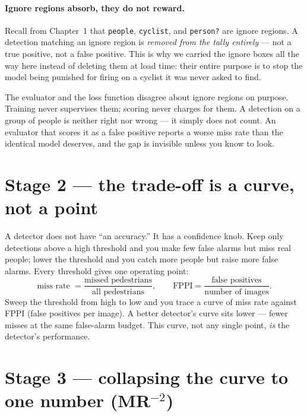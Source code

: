 \documentclass[../main.tex]{subfiles}
\begin{document}
\paragraph{Ignore regions absorb, they do not reward.} Recall from Chapter~1 that
\texttt{people}, \texttt{cyclist}, and \texttt{person?} are ignore regions. A detection matching
an ignore region is \emph{removed from the tally entirely} --- not a true positive, not a false
positive. This is why we carried the ignore boxes all the way here instead of deleting them at
load time: their entire purpose is to stop the model being punished for firing on a cyclist it
was never asked to find.

\begin{lesson}
The evaluator and the loss function disagree about ignore regions on purpose. Training never
supervises them; scoring never charges for them. A detection on a group of people is neither
right nor wrong --- it simply does not count. An evaluator that scores it as a false positive
reports a worse miss rate than the identical model deserves, and the gap is invisible unless you
know to look.
\end{lesson}

\section{Stage 2 --- the trade-off is a curve, not a point}

A detector does not have ``an accuracy.'' It has a confidence knob. Keep only detections above a
high threshold and you make few false alarms but miss real people; lower the threshold and you
catch more people but raise more false alarms. Every threshold gives one operating point:
\[
  \text{miss rate } = \frac{\text{missed pedestrians}}{\text{all pedestrians}},
  \qquad
  \text{FPPI} = \frac{\text{false positives}}{\text{number of images}}.
\]
Sweep the threshold from high to low and you trace a curve of miss rate against FPPI (false
positives per image). A better detector's curve sits lower --- fewer misses at the same false-alarm
budget. This curve, not any single point, \emph{is} the detector's performance.

\section{Stage 3 --- collapsing the curve to one number (MR$^{-2}$)}
\end{document}
